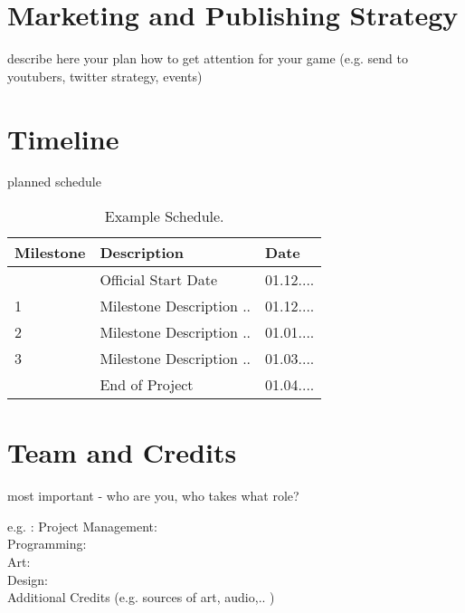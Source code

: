 \documentclass[a4paper]{scrreprt}
\begin{document}


\chapter{Marketing and Publishing Strategy}

describe here your plan how to get attention for your game (e.g. send to youtubers, twitter strategy, events)





\chapter{Timeline}

planned schedule

\begin{table}[h]
\centering
\begin{tabular}{|l|l|l|}
\hline
Milestone & Description & Date \\\hline
& Official Start Date & 01.12.... \\
1 & Milestone Description ..  & 01.12.... \\
2 & Milestone Description ..  & 01.01.... \\
3 & Milestone Description ..  & 01.03.... \\
& End of Project & 01.04.... \\
\hline
\end{tabular}
\caption{\label{tab:schedule}Example Schedule.}
\end{table}




\chapter{Team and Credits}

most important - who are you, who takes what role?

e.g. :
Project Management: \\
Programming: \\
Art: \\
Design: \\

Additional Credits (e.g. sources of art, audio,.. )


%
%
\end{document}
